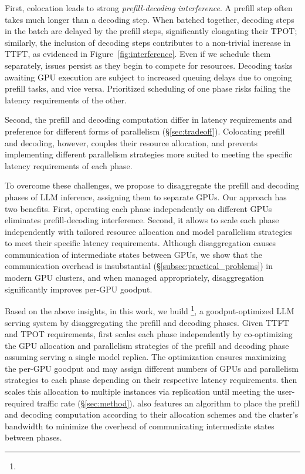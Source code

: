 First, colocation leads to strong \emph{prefill-decoding interference}.
A prefill step often takes much longer than a decoding step. When batched together, decoding steps in the batch are delayed by the prefill steps, significantly elongating their TPOT; similarly, the inclusion of decoding steps contributes to a non-trivial increase in TTFT, as evidenced in Figure~\ref{fig:interference}.
Even if we schedule them separately, issues persist as they begin to compete for resources. Decoding tasks awaiting GPU execution are subject to increased queuing delays due to ongoing prefill tasks, and vice versa. Prioritized scheduling of one phase risks failing the latency requirements of the other.

Second, the prefill and decoding computation differ in latency requirements and preference for different forms of parallelism (\S\ref{sec:tradeoff}). Colocating prefill and decoding, however, couples their resource allocation, and prevents implementing different parallelism strategies more suited to meeting the specific latency requirements of each phase. 

To overcome these challenges, we propose to disaggregate the prefill and decoding phases of LLM inference, assigning them to separate GPUs. Our approach has two benefits.
First, operating each phase independently on different GPUs eliminates prefill-decoding interference. Second, it allows to scale each phase independently with tailored resource allocation and model parallelism strategies to meet their specific latency requirements.
Although disaggregation causes communication of intermediate states between GPUs, we show that the communication overhead is insubstantial (\S\ref{subsec:practical_problems}) in modern GPU clusters, and when managed appropriately, disaggregation significantly improves per-GPU goodput. 

Based on the above insights, in this work, we build \sys\footnote{}, a goodput-optimized LLM serving system by disaggregating the prefill and decoding phases. Given TTFT and TPOT requirements, \sys first scales each phase independently by co-optimizing the GPU allocation and parallelism strategies of the prefill and decoding phase assuming serving a single model replica. The optimization ensures maximizing the per-GPU goodput and may assign different numbers of GPUs and parallelism strategies to each phase depending on their respective latency requirements. \sys then scales this allocation to multiple instances via replication until meeting the user-required traffic rate (\S\ref{sec:method}). 
\sys also features an algorithm to place the prefill and decoding computation according to their allocation schemes and the cluster's bandwidth to minimize the overhead of communicating intermediate states between phases.

